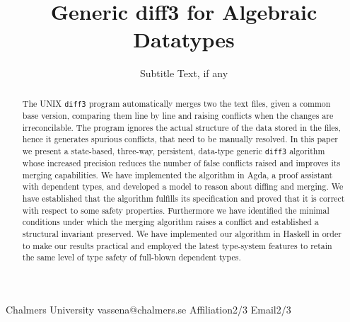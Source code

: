 \documentclass[preprint]{sigplanconf}
\theoremstyle{plain}
\begin{document}
\setlength{\pdfpageheight}{\paperheight}
\setlength{\pdfpagewidth}{\paperwidth}






\title{Generic diff3 for Algebraic Datatypes}
\subtitle{Subtitle Text, if any}

           {Chalmers University}
           {vassena@chalmers.se}
           {Affiliation2/3}
           {Email2/3}

\maketitle

\begin{abstract}
  The UNIX \texttt{diff3} program automatically merges two the text
  files, given a common base version, comparing them line by line and
  raising conflicts when the changes are irreconcilable.
  The program ignores the actual structure of the data stored in the
  files, hence it generates spurious conflicts, that need to be
  manually resolved.
  In this paper we present a state-based, three-way, persistent,
  data-type generic \texttt{diff3} algorithm whose increased precision
  reduces the number of false conflicts raised and improves its
  merging capabilities.
  We have implemented the algorithm in Agda, a proof assistant with
  dependent types, and developed a model to reason about diffing and
  merging.
  We have established that the algorithm fulfills its specification
  and proved that it is correct with respect to some safety
  properties.
  Furthermore we have identified the minimal conditions under which
  the merging algorithm raises a conflict and established a structural
  invariant preserved.
  We have implemented our algorithm in Haskell in order to make our results
  practical and employed the latest type-system features to retain the
  same level of type safety of full-blown dependent types.
\end{abstract}
\end{document}
